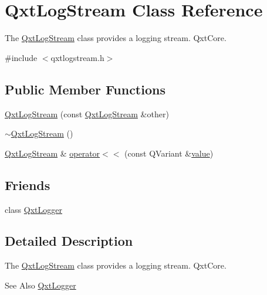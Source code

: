 \hypertarget{class_qxt_log_stream}{\section{Qxt\-Log\-Stream Class Reference}
\label{class_qxt_log_stream}
}


The \hyperlink{class_qxt_log_stream}{Qxt\-Log\-Stream} class provides a logging stream.  Qxt\-Core.  




{\ttfamily \#include $<$qxtlogstream.\-h$>$}

\subsection*{Public Member Functions}
\begin{DoxyCompactItemize}
\item 
\hyperlink{class_qxt_log_stream_ab3ebe071e0d199d6bce45fbca4db7871}{Qxt\-Log\-Stream} (const \hyperlink{class_qxt_log_stream}{Qxt\-Log\-Stream} \&other)
\item 
\hyperlink{class_qxt_log_stream_ac9036a9d1baf79f4fb106f70907b48ff}{$\sim$\-Qxt\-Log\-Stream} ()
\item 
\hyperlink{class_qxt_log_stream}{Qxt\-Log\-Stream} \& \hyperlink{class_qxt_log_stream_ad5709b5c5173f3bd0d6c253fd6723753}{operator$<$$<$} (const Q\-Variant \&\hyperlink{glext_8h_aa0e2e9cea7f208d28acda0480144beb0}{value})
\end{DoxyCompactItemize}
\subsection*{Friends}
\begin{DoxyCompactItemize}
\item 
class \hyperlink{class_qxt_log_stream_a8ad721e58be5d2c7fb399e38f2a07a2c}{Qxt\-Logger}
\end{DoxyCompactItemize}


\subsection{Detailed Description}
The \hyperlink{class_qxt_log_stream}{Qxt\-Log\-Stream} class provides a logging stream.  Qxt\-Core. 

\begin{DoxySeeAlso}{See Also}
\hyperlink{class_qxt_logger}{Qxt\-Logger} 
\end{DoxySeeAlso}



